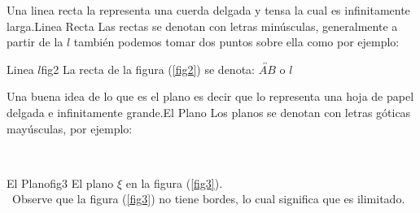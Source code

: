 \begin{tndefinido}{Una linea recta la representa una cuerda delgada y tensa la cual es
infinitamente larga.}{Linea Recta}
Las rectas se denotan con letras min\'{u}sculas, generalmente a partir de la
$l$ tambi\'{e}n podemos tomar dos puntos sobre ella como por ejemplo:
\begin{figura}{
}{Linea $l$}{fig2}
La recta de la figura (\ref{fig2}) se denota: $\overleftrightarrow{AB}$ o $l$
\end{figura}
\end{tndefinido}
\begin{tndefinido}{Una buena idea de lo que es el plano es decir que lo representa una hoja de
papel delgada e infinitamente grande.}{El Plano}
 Los planos se denotan con letras g\'{o}ticas may\'{u}sculas, por ejemplo:
\vskip -40pt
\begin{figura}{
\\
}{El Plano}{fig3}
El plano $\xi$ en la figura (\ref{fig3}).\\ \nota \, Observe que la figura (\ref{fig3}) no tiene bordes,
 lo cual significa  que es ilimitado.
\end{figura}
\end{tndefinido}
